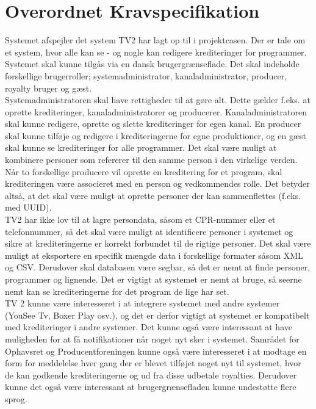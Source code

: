 \section{Overordnet Kravspecifikation}

\noindent
Systemet afspejler det system TV2 har lagt op til i projektcasen. Der er tale om et system, hvor alle kan se - og nogle kan redigere krediteringer for programmer. Systemet skal kunne tilgås via en dansk brugergrænseflade. Det skal indeholde forskellige brugerroller; systemadministrator, kanaladministrator, producer, royalty bruger og gæst.\\

\noindent
Systemadministratoren skal have rettigheder til at gøre alt. Dette gælder f.eks. at oprette krediteringer, kanaladministratorer og producerer. Kanaladministratoren skal kunne redigere, oprette og slette krediteringer for egen kanal. En producer skal kunne tilføje og redigere i krediteringerne for egne produktioner, og en gæst skal kunne se krediteringer for alle programmer. 
Det skal være muligt at kombinere personer som refererer til den samme person i den virkelige verden. Når to forskellige producere vil oprette en kreditering for et program, skal krediteringen være associeret med en person og vedkommendes rolle. Det betyder altså, at det skal være muligt at oprette personer der kan sammenflettes (f.eks. med UUID).\\

\noindent
TV2 har ikke lov til at lagre persondata, såsom et CPR-nummer eller et telefonnummer, så det skal være muligt at identificere personer i systemet og sikre at krediteringerne er korrekt forbundet til de rigtige personer.
Det skal være muligt at eksportere en specifik mængde data i forskellige formater såsom XML og CSV. Derudover skal databasen være søgbar, så det er nemt at finde personer, programmer og lignende. Det er vigtigt at systemet er nemt at bruge, så seerne nemt kan se krediteringerne for det program de lige har set.\\

\noindent
TV 2 kunne være interesseret i at integrere systemet med andre systemer (YouSee Tv, Boxer Play osv.), og det er derfor vigtigt at systemet er kompatibelt med krediteringer i andre systemer. Det kunne også være interessant at have muligheden for at få notifikationer når noget nyt sker i systemet. Samrådet for Ophavsret og Producentforeningen kunne også være interesseret i at modtage en form for meddelelse hver gang der er blevet tilføjet noget nyt til systemet, hvor de kan godkende krediteringerne og ud fra disse udbetale royalties. Derudover kunne det også være interessant at brugergrænsefladen kunne undestøtte flere sprog.\\

